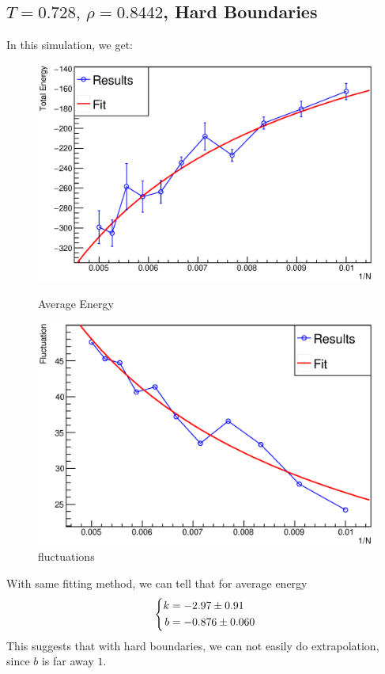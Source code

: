 \documentclass[UTF8,a4paper]{article}
\begin{document}
\subsection{$T =0.728,\, \rho = 0.8442$, Hard Boundaries}
In this simulation, we get:
\begin{figure}[H]
	\centering
	\begin{minipage}[t]{0.45\textwidth}
		\centering
		\includegraphics[height=0.2\textheight]{Root Fit/fit_exp1_h.eps}
		\caption{Average Energy}
	\end{minipage}\hspace{0.5cm}
	\begin{minipage}[t]{0.45\textwidth}
		\centering
		\includegraphics[height=0.2\textheight]{Root Fit/fit_exp1_flu_h.eps}
		\caption{fluctuations}
	\end{minipage}
\end{figure}
With same fitting method, we can tell that for average energy
\begin{equation}
	\left\{
	\begin{aligned}
		k & = \num[separate-uncertainty = true]{-2.97+-0.91}  \\
		b & = \num[separate-uncertainty = true]{-0.876+-0.06}
	\end{aligned}
	\right.
\end{equation}
This suggests that with hard boundaries, we can not easily do extrapolation, since $b$ is far away $1$.
\end{document}
